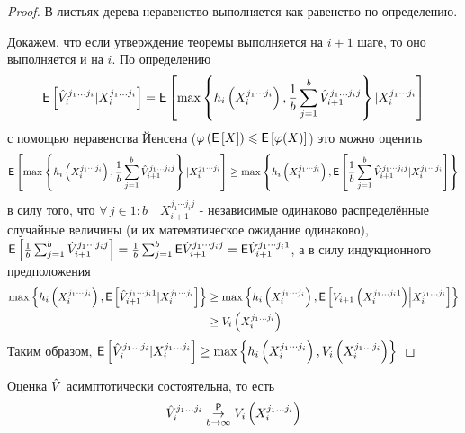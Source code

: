 	\begin{proof}
		\par В листьях дерева неравенство выполняется как равенство по определению.
		\par Докажем, что если утверждение теоремы выполняется на $i+1$ шаге, то оно выполняется и на $i$. По определению
		\begin{equation*}
		\mathsf{E}\left[\hat{V}_i^{j_1\ldots j_i}|X_i^{j_1\ldots j_i}\right] = \mathsf{E}\left[ \max\left\lbrace h_i\left(X_i^{j_1\cdots j_i}\right), \frac{1}{b}\sum_{j = 1}^b \hat{V}_{i+1}^{j_1 \ldots j_i j}\right\rbrace | X_i^{j_1\cdots j_i} \right]
		\end{equation*}
		с помощью неравенства Йенсена ($\varphi\left(\mathsf{E}\left[X\right]\right) \leqslant \mathsf{E}\left[\varphi(X)\right]$) это можно оценить
		\begin{equation*}
		\mathsf{E}\left[ \max\left\lbrace h_i\left(X_i^{j_1\cdots j_i}\right), \frac{1}{b}\sum_{j = 1}^b \hat{V}_{i+1}^{j_1 \ldots j_i j}\right\rbrace | X_i^{j_1\cdots j_i} \right] \geq \max\left\lbrace h_i\left(X_i^{j_1\cdots j_i}\right), \mathsf{E}\left[ \frac{1}{b}\sum_{j = 1}^b \hat{V}_{i+1}^{j_1 \cdots j_i j} | X_i^{j_1\cdots j_i} \right] \right\rbrace
		\end{equation*}
		в силу того, что $\forall \, j \in 1:b \quad X_{i+1}^{j_1\cdots j_i j}$ - независимые одинаково распределённые случайные величины (и их математическое ожидание одинаково), $\mathsf{E}\left[ \frac{1}{b}\sum_{j = 1}^b \hat{V}_{i+1}^{j_1 \cdots j_i j} \right] = \frac{1}{b}\sum_{j = 1}^b \mathsf{E}\hat{V}_{i+1}^{j_1 \cdots j_i j} = \mathsf{E}\hat{V}_{i+1}^{j_1 \cdots j_i 1}$, а в силу индукционного предположения
		\begin{equation*}
		\begin{aligned}
		\max\left\lbrace 
			h_i\left(X_i^{j_1\cdots j_i}\right), 
			\mathsf{E}\left[ \hat{V}_{i+1}^{j_1 \cdots j_i 1} | X_i^{j_1\cdots j_i} \right] 
		\right\rbrace &\geq \max \left\lbrace 
			h_i\left(X_i^{j_1\cdots j_i}\right),
			\mathsf{E}\left[V_{i+1}\left(X_i^{j_1\ldots j_i 1}\right)\middle\vert X_i^{j_1\ldots j_i}\right]
		\right\rbrace \\ &\geq V_i\left(X_i^{j_1\ldots j_i}\right)
		\end{aligned}
		\end{equation*}
		Таким образом, $\mathsf{E}\left[\hat{V}_i^{j_1\ldots j_i}|X_i^{j_1\ldots j_i}\right] \geq \max \left\lbrace h_i\left(X_i^{j_1\cdots j_i}\right), V_i\left(X_i^{j_1\ldots j_i}\right) \right\rbrace$
	\end{proof}
	\begin{theorem} Оценка $\hat{V}$ асимптотически состоятельна, то есть
		$$\hat{V}_i^{j_1\ldots j_i} \underset{b\to\infty}{\overset{\mathsf{P}}{\to}} V_i\left(X_i^{j_1\ldots j_i}\right)$$
	\end{theorem}
